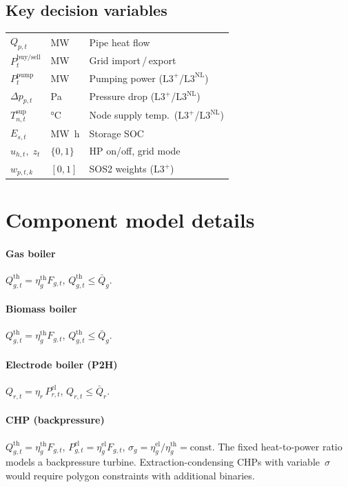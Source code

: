 \documentclass[review,3p]{elsarticle}
\newcommand{\Lplus}{\mathrm{L3}^{+}}
\newcommand{\Lnl}{\mathrm{L3}^{\mathrm{NL}}}
\begin{document}
\subsection*{Key decision variables}

\begin{tabular}{@{} >{\raggedright}p{2.8cm} l p{6.5cm} @{}}
$Q_{p,t}$       & \si{\mega\watt}
  & Pipe heat flow \\
$P_t^{\mathrm{buy/sell}}$ & \si{\mega\watt}
  & Grid import\,/\,export \\
$P_t^{\mathrm{pump}}$ & \si{\mega\watt}
  & Pumping power ($\Lplus$/$\Lnl$) \\
$\Delta p_{p,t}$ & \si{\pascal}
  & Pressure drop ($\Lplus$/$\Lnl$) \\
$T_{n,t}^{\mathrm{sup}}$ & \si{\celsius}
  & Node supply temp.\ ($\Lplus$/$\Lnl$) \\
$E_{s,t}$       & \si{\mega\watt\hour}
  & Storage SOC \\
$u_{h,t},\; z_t$  & $\{0,1\}$
  & HP on/off, grid mode \\
$w_{p,t,k}$     & $[0,1]$
  & SOS2 weights ($\Lplus$) \\
\end{tabular}

\section{Component model details}
\label{app:component_models}

\paragraph{Gas boiler}
$Q_{g,t}^{\mathrm{th}} = \eta_g^{\mathrm{th}} F_{g,t}$,\quad
$Q_{g,t}^{\mathrm{th}} \leq \bar{Q}_g$.

\paragraph{Biomass boiler}
$Q_{g,t}^{\mathrm{th}} = \eta_g^{\mathrm{th}} F_{g,t}$,\quad
$Q_{g,t}^{\mathrm{th}} \leq \bar{Q}_g$.

\paragraph{Electrode boiler (P2H)}
$Q_{r,t} = \eta_r\, P_{r,t}^{\mathrm{el}}$,\quad
$Q_{r,t} \leq \bar{Q}_r$.

\paragraph{CHP (backpressure)}
$Q_{g,t}^{\mathrm{th}} = \eta_g^{\mathrm{th}} F_{g,t}$,\quad
$P_{g,t}^{\mathrm{el}} = \eta_g^{\mathrm{el}} F_{g,t}$,\quad
$\sigma_g = \eta_g^{\mathrm{el}} / \eta_g^{\mathrm{th}} =
\mathrm{const}$.
The fixed heat-to-power ratio models a backpressure turbine.
Extraction-condensing CHPs with variable~$\sigma$ would require
polygon constraints with additional binaries.
\end{document}
